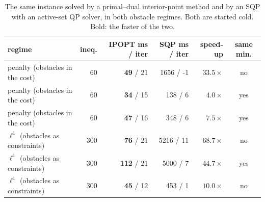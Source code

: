 \begin{table}[htbp]
  \centering
  \small
  \caption{The same instance solved by a primal--dual interior-point method and by an SQP with an active-set QP solver, in both obstacle regimes. Both are started cold. Bold: the faster of the two.}
  \label{res:tab:solvercmp}
  \begin{tabular}{lrrrrc}
    \toprule
    regime & ineq. & IPOPT ms / iter & SQP ms / iter & speed-up & same min. \\
    \midrule
    penalty (obstacles in the cost) & 60 & \textbf{49} / 21 & 1656 / -1 & $33.5\times$ & no \\
    penalty (obstacles in the cost) & 60 & \textbf{34} / 15 & 138 / 6 & $4.0\times$ & yes \\
    penalty (obstacles in the cost) & 60 & \textbf{47} / 16 & 348 / 6 & $7.5\times$ & yes \\
    $\ell^1$ (obstacles as constraints) & 300 & \textbf{76} / 21 & 5216 / 11 & $68.7\times$ & no \\
    $\ell^1$ (obstacles as constraints) & 300 & \textbf{112} / 21 & 5000 / 7 & $44.7\times$ & yes \\
    $\ell^1$ (obstacles as constraints) & 300 & \textbf{45} / 12 & 453 / 1 & $10.0\times$ & no \\
    \bottomrule
  \end{tabular}
\end{table}

